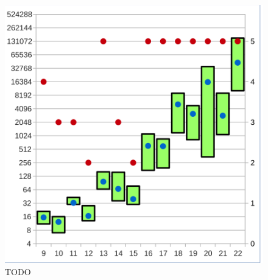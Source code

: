 \begin{figure}[!h]
\begin{minipage}[c]{0.45\textwidth}
  \includegraphics[scale=0.55]{images/data_know_xor}
  \end{minipage}
  \caption{TODO}
  \label{fig:data_know}
\end{figure}